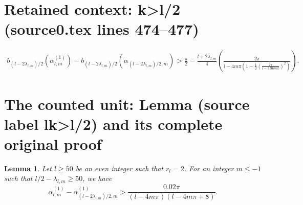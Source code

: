 \documentclass[10pt,a4paper]{amsart}
\theoremstyle{plain}
\newtheorem{lem}{Lemma}
\begin{document}
\section*{Retained context: k>l/2 (source0.tex lines 474--477)}

\begin{align}\label{k>l/2}
b_{(l-2\lambda_{l,m})/2}(\alpha_{l,m}^{(1)})-b_{(l-2\lambda_{l,m})/2}(\alpha_{(l-2\lambda_{l,m})/2,m})
>\frac{\pi}{2}-\frac{l+2\lambda_{l,m}}{4}\left(\frac{2\pi}{l-4m\pi\left(1-\frac{1}{2}\left(\frac{2\pi}{l-3.96m\pi}\right)^2\right)}\right).
\end{align}


\section{The counted unit: Lemma (source label lk>l/2) and its complete original proof}

\begin{lem}\label{lk>l/2}
Let $l\ge50$ be an even integer such that $r_l=2$. For an integer $m\le-1$ such that $l/2-\lambda_{l,m}\ge 50$, we have
$$
\alpha_{l,m}^{(1)}-\alpha_{(l-2\lambda_{l,m})/2,m}^{(1)}>\frac{0.02\pi}{(l-4m\pi)(l-4m\pi+8)}.
$$
\end{lem}
\end{document}
